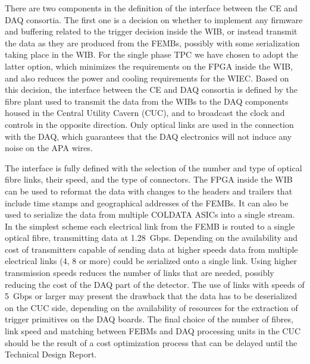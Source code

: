 There are two components in the definition of the interface between the CE
and DAQ consortia. The first one is a decision on whether to implement any
firmware and buffering related to the trigger decision inside the WIB, or
instead transmit the data as they are produced from the FEMBs, possibly with
some serialization taking place in the WIB. For the single phase TPC we have
chosen to adopt the latter option, which minimizes the requirements on the
FPGA inside the WIB, and also reduces the power and cooling requirements for the WIEC.
Based on this decision, the interface between the CE and DAQ consortia is
defined by the fibre plant
used to transmit the data from the WIBs to the DAQ components housed in the
Central Utility Cavern (CUC), and to broadcast the clock and controls in the
opposite direction. Only optical links are used in the connection with the DAQ,
which guarantees that the DAQ electronics will not induce any noise on the
APA wires.

The interface is fully defined with the selection of the number
and type of optical fibre links, their speed, and the type of connectors.
The FPGA inside the WIB can be used to reformat the data with changes to
the headers and trailers that include time stamps and geographical addresses
of the FEMBs. It can also be used to serialize the data from multiple
COLDATA ASICs into a single stream. In the simplest scheme each electrical
link from the FEMB is routed to a single optical fibre, transmitting data
at 1.28~Gbps. Depending on the availability and cost of transmitters
capable of sending data at higher speeds data from multiple electrical
links (4, 8 or more) could be serialized onto a single link. Using higher transmission
speeds reduces the number of links that are needed, possibly reducing the
cost of the DAQ part of the detector. The use of links with speeds
of 5~Gbps or larger may present the
drawback that the data has to be deserialized on the CUC side, depending
on the availability of resources for the extraction of trigger primitives
on the DAQ boards. The final choice of the number of fibres, link speed and
matching between FEBMs and DAQ processing units in the CUC should be
the result of a cost optimization process that can be delayed until
the Technical Design Report.


